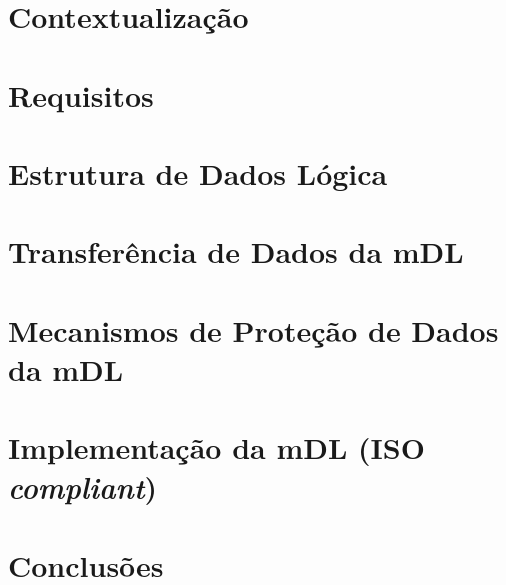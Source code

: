 \documentclass[11pt]{article}
\begin{document}
\section{Contextualização}


\section{Requisitos}


\section{Estrutura de Dados Lógica}


\section{Transferência de Dados da mDL}


\section{Mecanismos de Proteção de Dados da mDL}


\section{Implementação da mDL (ISO \textit{compliant})}


\newpage
\section{Conclusões}



\newpage


\end{document}
